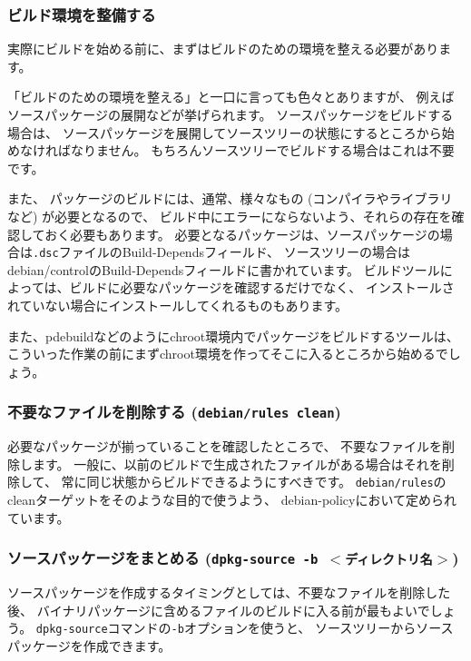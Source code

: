 \documentclass[mingoth,a4paper]{jsarticle}
\begin{document}
\subsubsection{ビルド環境を整備する}

実際にビルドを始める前に、まずはビルドのための環境を整える必要があります。

「ビルドのための環境を整える」と一口に言っても色々とありますが、
例えばソースパッケージの展開などが挙げられます。
ソースパッケージをビルドする場合は、
ソースパッケージを展開してソースツリーの状態にするところから始めなければなりません。
もちろんソースツリーでビルドする場合はこれは不要です。

また、
パッケージのビルドには、通常、様々なもの (コンパイラやライブラリなど) が必要となるので、
ビルド中にエラーにならないよう、それらの存在を確認しておく必要もあります。
必要となるパッケージは、ソースパッケージの場合は\texttt{.dsc}ファイルのBuild-Dependsフィールド、
ソースツリーの場合はdebian/controlのBuild-Dependsフィールドに書かれています。
ビルドツールによっては、ビルドに必要なパッケージを確認するだけでなく、
インストールされていない場合にインストールしてくれるものもあります。

また、pdebuildなどのようにchroot環境内でパッケージをビルドするツールは、
こういった作業の前にまずchroot環境を作ってそこに入るところから始めるでしょう。

\subsubsection{不要なファイルを削除する (\texttt{debian/rules clean})}

必要なパッケージが揃っていることを確認したところで、
不要なファイルを削除します。
一般に、以前のビルドで生成されたファイルがある場合はそれを削除して、
常に同じ状態からビルドできるようにすべきです。
\texttt{debian/rules}のcleanターゲットをそのような目的で使うよう、
debian-policyにおいて定められています。

\subsubsection{ソースパッケージをまとめる (\texttt{dpkg-source -b $<$ディレクトリ名$>$})}

ソースパッケージを作成するタイミングとしては、不要なファイルを削除した後、
バイナリパッケージに含めるファイルのビルドに入る前が最もよいでしょう。
\texttt{dpkg-source}コマンドの\texttt{-b}オプションを使うと、
ソースツリーからソースパッケージを作成できます。
\end{document}
